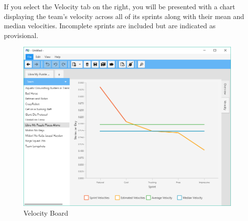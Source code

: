 If you select the Velocity tab on the right, you will be presented with a chart displaying the team's velocity across all of its sprints along with their mean and median velocities. Incomplete sprints are included but are indicated as provisional.

\begin{figure}[H]
\centering
\includegraphics[width=\textwidth]{images/screenshots/velocity_board.PNG}
\caption{Velocity Board}
\label{fig:new_project}
\end{figure}